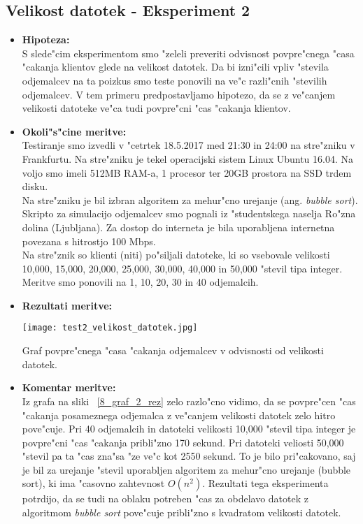 \subsection{Velikost datotek - Eksperiment 2}
\label{8_subsec:eksperiment_2}
\begin{itemize}
	\item \textbf{Hipoteza: }  \\
		S slede"cim eksperimentom smo "zeleli preveriti odvisnost povpre"cnega "casa "cakanja klientov glede na velikost datotek. Da bi izni"cili vpliv "stevila odjemalcev na ta poizkus smo teste ponovili na ve"c razli"cnih "stevilih odjemalcev. V tem primeru predpostavljamo hipotezo, da se z ve"canjem velikosti datoteke ve"ca tudi povpre"cni "cas "cakanja klientov.

	\item \textbf{Okoli"s"cine meritve: } \\
		Testiranje smo izvedli v "cetrtek 18.5.2017 med 21:30 in 24:00 na stre"zniku v Frankfurtu. Na stre"zniku je tekel operacijski sistem Linux Ubuntu 16.04. Na voljo smo imeli 512MB RAM-a, 1 procesor ter 20GB prostora na SSD trdem disku.\\ Na stre"zniku je bil izbran algoritem za mehur"cno urejanje (ang. \textit{bubble sort}). Skripto za simulacijo odjemalcev smo pognali iz "studentskega naselja Ro"zna dolina (Ljubljana). Za dostop do interneta je bila uporabljena internetna povezana s hitrostjo 100 Mbps.\\ Na stre"znik so klienti (niti) po"siljali datoteke, ki so vsebovale velikosti 10,000, 15,000, 20,000, 25,000, 30,000, 40,000 in 50,000 "stevil tipa integer. Meritve smo ponovili na 1, 10, 20, 30 in 40 odjemalcih.

 	\item \textbf{Rezultati meritve: }  \\

    \begin{table}[!h]
      \centering
        \texttt{[image: test2\_velikost\_datotek.jpg]}
      \caption{Graf povpre"cnega "casa "cakanja odjemalcev v odvisnosti od velikosti datotek.}
      \label{8_graf_2_rez}
    \end{table}

    \pagebreak
	\item \textbf{Komentar meritve: } \\
		Iz grafa na sliki ~\ref{8_graf_2_rez} zelo razlo"cno vidimo, da se povpre"cen "cas "cakanja posameznega odjemalca z ve"canjem velikosti datotek zelo hitro pove"cuje. Pri 40 odjemalcih in datoteki velikosti 10,000 "stevil tipa integer je povpre"cni "cas "cakanja pribli"zno 170 sekund. Pri datoteki veliosti 50,000 "stevil pa ta "cas zna"sa "ze ve"c kot 2550 sekund. To je bilo pri"cakovano, saj je bil za urejanje "stevil uporabljen algoritem za mehur"cno urejanje (bubble sort), ki ima "casovno zahtevnost $O(n^2)$. Rezultati tega eksperimenta potrdijo, da se tudi na oblaku potreben "cas za obdelavo datotek z algoritmom \textit{bubble sort} pove"cuje pribli"zno s kvadratom velikosti datotek.
\end{itemize}

